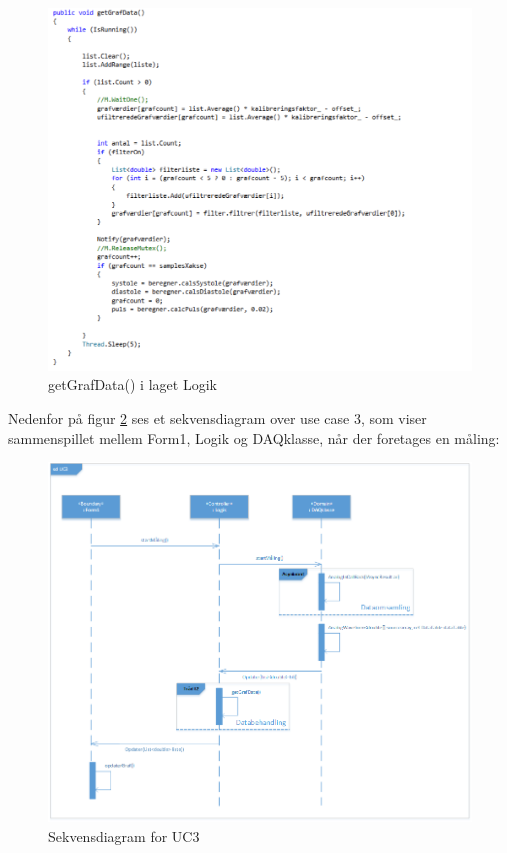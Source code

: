 \begin{figure}[H]
	\includegraphics[width=1.3\textwidth]{Figurer/Jeppe/6}
	\caption{getGrafData() i laget Logik}
	\label{kode4}
\end{figure}

Nedenfor på figur \ref{UC3sekvens} ses et sekvensdiagram over use case 3, som viser sammenspillet mellem Form1, Logik og DAQklasse, når der foretages en måling:

\begin{figure}[H]
	\includegraphics[width=1\textwidth]{Figurer/Softwareimplementering/UC3_sekvens}
	\caption{Sekvensdiagram for UC3}
	\label{UC3sekvens}
\end{figure}

